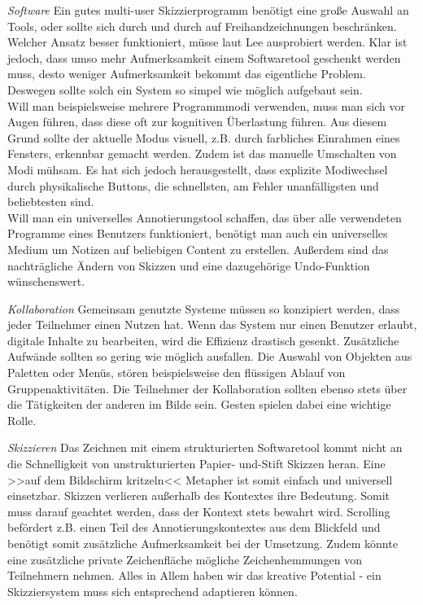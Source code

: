 \medskip \emph{Software} Ein gutes multi-user Skizzierprogramm benötigt eine große Auswahl an Tools, oder sollte sich durch und durch auf Freihandzeichnungen beschränken. Welcher Ansatz besser funktioniert, müsse laut Lee ausprobiert werden. Klar ist jedoch, dass umso mehr Aufmerksamkeit einem Softwaretool geschenkt werden muss, desto weniger Aufmerksamkeit bekommt das eigentliche Problem. Deswegen sollte solch ein System so simpel wie möglich aufgebaut sein. \\
Will man beispielsweise mehrere Programmmodi verwenden, muss man sich vor Augen führen, dass diese oft zur kognitiven Überlastung führen. Aus diesem Grund sollte der aktuelle Modus visuell, z.B. durch farbliches Einrahmen eines Fensters, erkennbar gemacht werden. Zudem ist das manuelle Umschalten von Modi mühsam. Es hat sich jedoch herausgestellt, dass explizite Modiwechsel durch physikalische Buttons, die schnellsten, am Fehler unanfälligsten und beliebtesten sind. \\
Will man ein universelles Annotierungstool schaffen, das über alle verwendeten Programme eines Benutzers funktioniert, benötigt man auch ein universelles Medium um Notizen auf beliebigen Content zu erstellen. Außerdem sind das nachträgliche Ändern von Skizzen und eine dazugehörige Undo-Funktion wünschenswert.

\medskip \emph{Kollaboration} Gemeinsam genutzte Systeme müssen so konzipiert werden, dass jeder Teilnehmer einen Nutzen hat. Wenn das System nur einen Benutzer erlaubt, digitale Inhalte zu bearbeiten, wird die Effizienz drastisch gesenkt. Zusätzliche Aufwände sollten so gering wie möglich ausfallen. Die Auswahl von Objekten aus Paletten oder Menüs, stören beispielsweise den flüssigen Ablauf von Gruppenaktivitäten. Die Teilnehmer der Kollaboration sollten ebenso stets über die Tätigkeiten der anderen im Bilde sein. Gesten spielen dabei eine wichtige Rolle.

\medskip \emph{Skizzieren} Das Zeichnen mit einem strukturierten Softwaretool kommt nicht an die Schnelligkeit von unstrukturierten Papier- und-Stift Skizzen heran. Eine >>auf dem Bildschirm kritzeln<< Metapher ist somit einfach und universell einsetzbar. Skizzen verlieren außerhalb des Kontextes ihre Bedeutung. Somit muss darauf geachtet werden, dass der Kontext stets bewahrt wird. Scrolling befördert z.B. einen Teil des Annotierungskontextes aus dem Blickfeld und benötigt somit zusätzliche Aufmerksamkeit bei der Umsetzung. Zudem könnte eine zusätzliche private Zeichenfläche mögliche Zeichenhemmungen von Teilnehmern nehmen. Alles in Allem haben wir das kreative Potential - ein Skizziersystem muss sich entsprechend adaptieren können.

